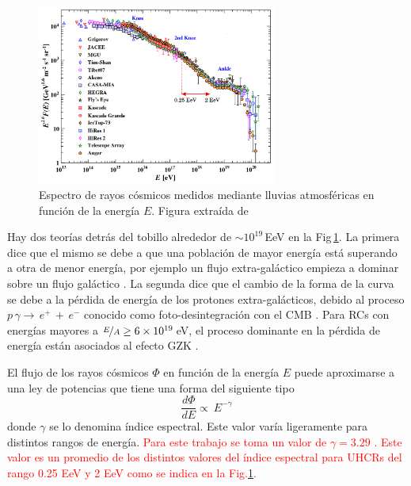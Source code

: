 \begin{figure}[H]
	\centering
	\includegraphics[width=0.7\textwidth]{auger_spectrum_v2.png}
	\caption{Espectro de rayos cósmicos medidos mediante lluvias atmosféricas en función de la energía $E$. Figura extraída de \cite{PGD}}
	\label{fig:spectra}
\end{figure}

Hay dos teorías detrás del tobillo alrededor de $\sim 10^{19}\,$EeV en la Fig\,\ref{fig:spectra}. La primera dice que el mismo se debe a que una población de mayor energía está superando a otra de menor energía, por ejemplo un flujo extra-galáctico empieza a dominar sobre un flujo galáctico \cite{bird1994cosmic}. La segunda dice que el cambio de la forma de la curva se debe a la pérdida de energía de los protones extra-galácticos, debido al proceso $p\,\gamma \rightarrow\,e^+\,+\,e^-$ conocido como foto-desintegración con el CMB \cite{berezinsky2006astrophysical}. Para RCs con energías  mayores  a $\nicefrac{E}{A} \geq 6\times 10^{19}\,$eV, el proceso dominante en la pérdida de energía están asociados al efecto GZK \cite{taborda}.

El flujo de los rayos cósmicos $\Phi$ en función de la energía $E$ puede aproximarse a una ley de potencias que tiene una forma del siguiente tipo
\begin{equation}
	    \frac{d\Phi}{dE} \propto \ E^{-\gamma}   \label{eq:expresion1}
\end{equation}
donde $\gamma$ se lo denomina índice espectral. Este valor varía ligeramente para distintos rangos de energía. \textcolor{red}{Para este trabajo se toma un valor de $\gamma = 3.29$ \cite{como_funciona_auger}. Este valor es un promedio de los distintos valores del índice espectral para UHCRs del rango 0.25 EeV y 2 EeV como se indica en la Fig.\ref{fig:spectra}.}


